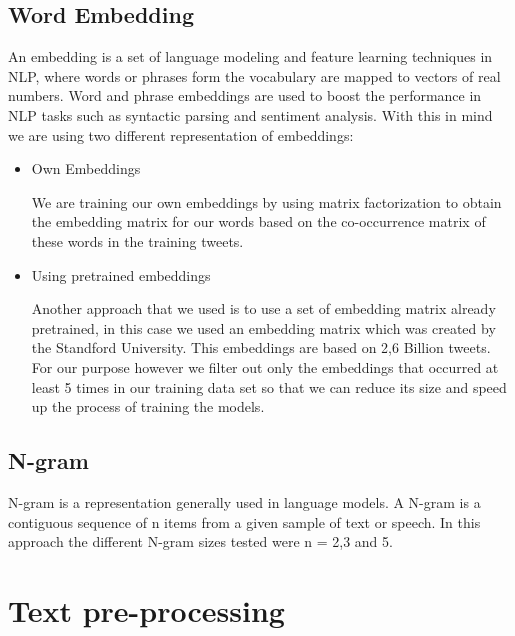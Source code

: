 \documentclass[10pt,conference,compsocconf]{IEEEtran}
\begin{document}
\subsection{Word Embedding}
 An embedding\cite{embeddings_01} is a set of language modeling and feature learning techniques in NLP, where words or phrases form the vocabulary are mapped to vectors of real numbers. Word and phrase embeddings are used to boost the performance in NLP tasks such as syntactic parsing and sentiment analysis.
With this in mind we are using two different representation of embeddings:
\begin{itemize}

\item Own Embeddings

We are training our own embeddings by using matrix factorization to obtain the embedding matrix for our words based on the co-occurrence matrix of these words in the training tweets.

\item Using pretrained embeddings 

Another approach that we used is to use a set of embedding matrix already pretrained, in this case we used an embedding matrix which was created by the Standford University\cite{embeddings_02}. This embeddings are based on 2,6 Billion tweets.
For our purpose however we filter out only the embeddings that occurred at least 5 times in our training data set so that we can reduce its size and speed up the process of training the models.
\end{itemize}
\subsection{N-gram}
N-gram is a representation generally used in language models. A N-gram is a contiguous sequence of n items from a given sample of text or speech. In this approach the different N-gram sizes tested were n = 2,3 and 5.

\section{Text pre-processing}
\end{document}
